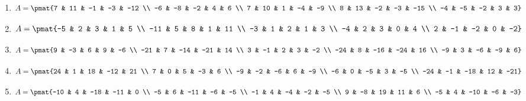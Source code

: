 \begin{enumerate}
\item

\begin{align*}
A = \pmat{7 & 11 & -1 & -3 & -12 \\ -6 & -8 & -2 & 4 & 6 \\ 7 & 10 & 1 & -4 & -9 \\ 8 & 13 & -2 & -3 & -15 \\ -4 & -5 & -2 & 3 & 3}
\end{align*}

\item

\begin{align*}
A = \pmat{-5 & 2 & 3 & 1 & 5 \\ -11 & 5 & 8 & 1 & 11 \\ -3 & 1 & 2 & 1 & 3 \\ -4 & 2 & 3 & 0 & 4 \\ 2 & -1 & -2 & 0 & -2}
\end{align*}

\item

\begin{align*}
A = \pmat{9 & -3 & 6 & 9 & -6 \\ -21 & 7 & -14 & -21 & 14 \\ 3 & -1 & 2 & 3 & -2 \\ -24 & 8 & -16 & -24 & 16 \\ -9 & 3 & -6 & -9 & 6}
\end{align*}

\item

\begin{align*}
A = \pmat{24 & 1 & 18 & -12 & 21 \\ 7 & 0 & 5 & -3 & 6 \\ -9 & -2 & -6 & 6 & -9 \\ -6 & 0 & -5 & 3 & -5 \\ -24 & -1 & -18 & 12 & -21}
\end{align*}

\item

\begin{align*}
A = \pmat{-10 & 4 & -18 & -11 & 0 \\ -5 & 6 & -11 & -6 & -5 \\ -1 & 4 & -4 & -2 & -5 \\ 9 & -8 & 19 & 11 & 6 \\ -5 & 4 & -10 & -6 & -3}
\end{align*}


\end{enumerate}
